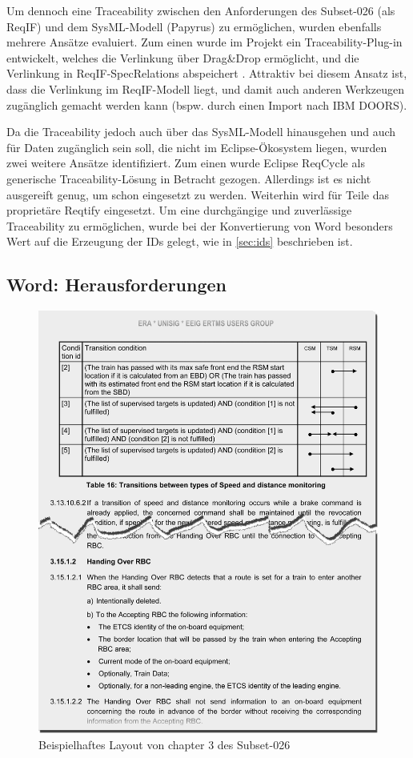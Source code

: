 \documentclass[twoside]{article}
\begin{document}
\begin{multicols}{2}
Um dennoch eine Traceability zwischen den Anforderungen des Subset-026 (als ReqIF) und dem SysML-Modell (Papyrus) zu ermöglichen, wurden ebenfalls mehrere Ansätze evaluiert.  Zum einen wurde im Projekt ein Traceability-Plug-in entwickelt, welches die Verlinkung über Drag\&Drop ermöglicht, und die Verlinkung in ReqIF-SpecRelations abspeichert \cite{rmf-traces}.  Attraktiv bei diesem Ansatz ist, dass die Verlinkung im ReqIF-Modell liegt, und damit auch anderen Werkzeugen zugänglich gemacht werden kann (bspw. durch einen Import nach IBM DOORS).

Da die Traceability jedoch auch über das SysML-Modell hinausgehen und auch für Daten zugänglich sein soll, die nicht im Eclipse-Ökosystem liegen, wurden zwei weitere Ansätze identifiziert.  Zum einen wurde Eclipse ReqCycle \cite{Todo} als generische Traceability-Lösung in Betracht gezogen.  Allerdings ist es nicht ausgereift genug, um schon eingesetzt zu werden.  Weiterhin wird für Teile das proprietäre Reqtify eingesetzt.  Um eine durchgängige und zuverlässige Traceability zu ermöglichen, wurde bei der Konvertierung von Word besonders Wert auf die Erzeugung der IDs gelegt, wie in \ref{sec:ids} beschrieben ist.

\subsection{Word: Herausforderungen}


\begin{figure}
\centering
\includegraphics[width=0.8\linewidth]{img/word_screenshot.png}
\caption{Beispielhaftes Layout von chapter 3 des Subset-026}
\label{fig:word_screenshot}
\end{figure}


\end{multicols}
\end{document}

